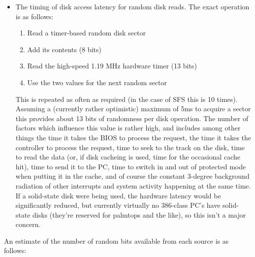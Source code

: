 \begin{itemize}
\item The timing of disk access latency for random disk reads.  The exact 
    operation is as follows:

    \begin{enumerate}
        \item Read a timer-based random disk sector
        \item Add its contents (8 bits)
        \item Read the high-speed 1.19 MHz hardware timer (13 bits)
        \item Use the two values for the next random sector
    \end{enumerate}

    This is repeated as often as required (in the case of SFS this is 10
    times).  Assuming a (currently rather optimistic) maximum of 5ms to acquire
    a sector this provides about 13 bits of randomness per disk operation.  The
    number of factors which influence this value is rather high, and includes
    among other things the time it takes the BIOS to process the request, the
    time it takes the controller to process the request, time to seek to the
    track on the disk, time to read the data (or, if disk cacheing is used,
    time for the occasional cache hit), time to send it to the PC, time to
    switch in and out of protected mode when putting it in the cache, and of
    course the constant 3-degree background radiation of other interrupts and
    system activity happening at the same time.  If a solid-state disk were
    being used, the hardware latency would be significantly reduced, but
    currently virtually no 386-class PC's have solid-state disks (they're
    reserved for palmtops and the like), so this isn't a major concern.
\end{itemize}

An estimate of the number of random bits available from each source is as
follows:

